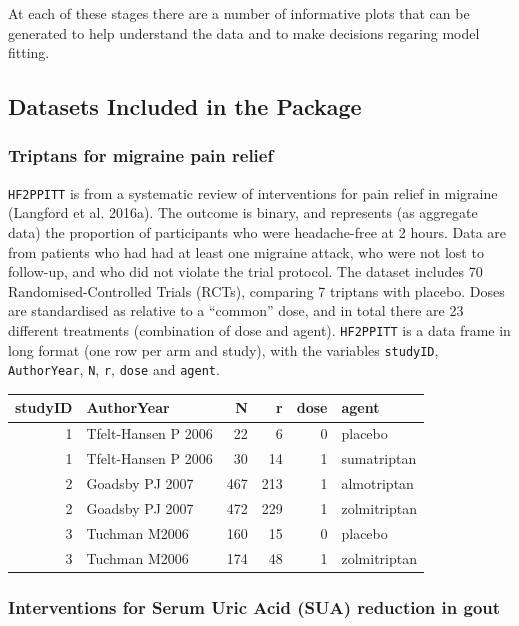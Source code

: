 \documentclass[]{article}
\begin{document}
At each of these stages there are a number of informative plots that can
be generated to help understand the data and to make decisions regaring
model fitting.

\hypertarget{datasets-included-in-the-package}{%
\subsection{Datasets Included in the
Package}\label{datasets-included-in-the-package}}

\hypertarget{triptans-for-migraine-pain-relief}{%
\subsubsection{Triptans for migraine pain
relief}\label{triptans-for-migraine-pain-relief}}

\texttt{HF2PPITT} is from a systematic review of interventions for pain
relief in migraine (Langford et al. 2016a). The outcome is binary, and
represents (as aggregate data) the proportion of participants who were
headache-free at 2 hours. Data are from patients who had had at least
one migraine attack, who were not lost to follow-up, and who did not
violate the trial protocol. The dataset includes 70
Randomised-Controlled Trials (RCTs), comparing 7 triptans with placebo.
Doses are standardised as relative to a ``common'' dose, and in total
there are 23 different treatments (combination of dose and agent).
\texttt{HF2PPITT} is a data frame in long format (one row per arm and
study), with the variables \texttt{studyID}, \texttt{AuthorYear},
\texttt{N}, \texttt{r}, \texttt{dose} and \texttt{agent}.

\begin{longtable}[]{@{}rlrrrl@{}}
\toprule
studyID & AuthorYear & N & r & dose & agent\tabularnewline
\midrule
\endhead
1 & Tfelt-Hansen P 2006 & 22 & 6 & 0 & placebo\tabularnewline
1 & Tfelt-Hansen P 2006 & 30 & 14 & 1 & sumatriptan\tabularnewline
2 & Goadsby PJ 2007 & 467 & 213 & 1 & almotriptan\tabularnewline
2 & Goadsby PJ 2007 & 472 & 229 & 1 & zolmitriptan\tabularnewline
3 & Tuchman M2006 & 160 & 15 & 0 & placebo\tabularnewline
3 & Tuchman M2006 & 174 & 48 & 1 & zolmitriptan\tabularnewline
\bottomrule
\end{longtable}

\hypertarget{interventions-for-serum-uric-acid-sua-reduction-in-gout}{%
\subsubsection{Interventions for Serum Uric Acid (SUA) reduction in
gout}\label{interventions-for-serum-uric-acid-sua-reduction-in-gout}}
\end{document}
